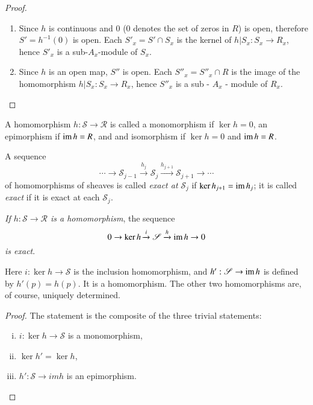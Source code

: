 \begin{proof}%
\begin{enumerate}[(1)]
\item  Since $h$ is continuous and 0 (0 denotes the set of zeros
  in $R$) is open, therefore $S' = h^{-1}(0)$ is open. Each $S'_x = S'
  \cap S_x$ is the kernel of $h | S_x : S_x \rightarrow R_x$,
  hence $S'_x$ is a sub-$A_x$-module of $S_x$. 

\item Since $h$ is an open map, $S''$ is open. Each $S''_x = S''_x \cap
  R$ is the image of the homomorphism $h | S_x : S_x \rightarrow
  R_x$, hence $S''_x$ is a sub - $A_x$ - module of $R_x$. 
\end{enumerate}
\end{proof}

\begin{defi*}%
A homomorphism $h : \mathscr{S} \rightarrow \mathscr{R}$ is
    called a monomorphism if $\ker h = 0$, an epimorphism if
$\operatorname{im} h = R$, and and isomorphism if $\ker h = 0$ and $\operatorname{im} h
= R$. 
\end{defi*}

\begin{defi*}%
A sequence
$$
\cdots \rightarrow \mathscr{S}_{j-1} \xrightarrow{h_j} \mathscr{S}_j
\xrightarrow{h_{j+1}} \mathscr{S}_{j+1} \rightarrow \cdots 
$$
of homomorphisms of sheaves is called {\em{exact at}} $\mathscr{S}_j$
if $\ker h_{j+1} = \operatorname{im}  h_j$; it is called {\em{exact}} if it is exact
at each $\mathscr{S}_j$. 
\end{defi*}
 
\textit{If $h : \mathscr{S} \rightarrow \mathscr{R}$  is a
  homomorphism}, the sequence 
$$
0 \rightarrow \ker h \xrightarrow{i} \mathscr{S} \xrightarrow{h}  \operatorname{im}
 h \rightarrow 0 
$$
\textit{is exact}.\pageoriginale

Here $i : \ker h \rightarrow \mathscr{S}$ is the inclusion
homomorphism, and $h' : \mathscr{S} \rightarrow \operatorname{im} h$ is defined
by $h'(p) = h(p)$. It is a homomorphism. The other two homomorphisms
are, of course, uniquely determined. 

\begin{proof}%
The statement is the composite of the three trivial statements: 
\begin{enumerate}[(i)]
\item $i : \ker h \rightarrow \mathscr{S}$ is a monomorphism,

\item $\ker h' = \ker h$,

\item $h' : \mathscr{S} \rightarrow  im h$ is an epimorphism.
\end{enumerate}
\end{proof}

